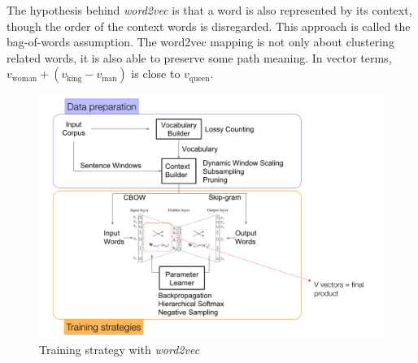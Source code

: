 \documentclass[11pt]{article}
\begin{document}
The hypothesis behind \emph{word2vec} is that a word is also represented by its context, though the order of the context words is disregarded. This approach is called the bag-of-words assumption. The word2vec mapping is not only about clustering related words, it is also able to preserve some path meaning. In vector terms, $v_{\text{woman}} + (v_{\text{king}} - v_{\text{man}})$ is close to $v_{\text{queen}}$.

\begin{figure}[tbh]
	\centering
	\includegraphics[width=0.6\linewidth]{img/word2vec_training_strategy}
	\caption{Training strategy with \emph{word2vec}}
	\label{fig:word2vectrainingstrategy}
\end{figure}
\end{document}
